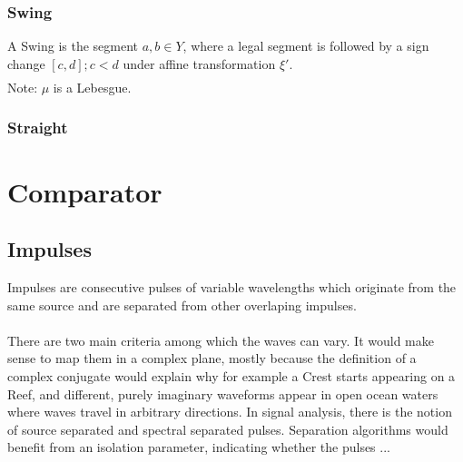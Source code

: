 \documentclass{article}
\begin{document}
\subsubsection{Swing}
A Swing is the segment $a,b \in Y$, where a legal segment is followed by a sign change $[c,d]; c<d$ under affine transformation $\xi'$.
\begin{align}
\end{align}
Note: $\mu$ is a Lebesgue.

\subsubsection{Straight}

\section{Comparator}
\subsection{Impulses}
Impulses are consecutive pulses of variable wavelengths which originate from the same source and are separated from other overlaping impulses.\\\\
There are two main criteria among which the waves can vary. It would make sense to map them in a complex plane, mostly because the definition of a complex conjugate would explain why for example a Crest starts appearing on a Reef, and different, purely imaginary waveforms appear in open ocean waters where waves travel in arbitrary directions. In signal analysis, there is the notion of source separated and spectral separated pulses. Separation algorithms would benefit from an isolation parameter, indicating whether the pulses ...
\end{document}

